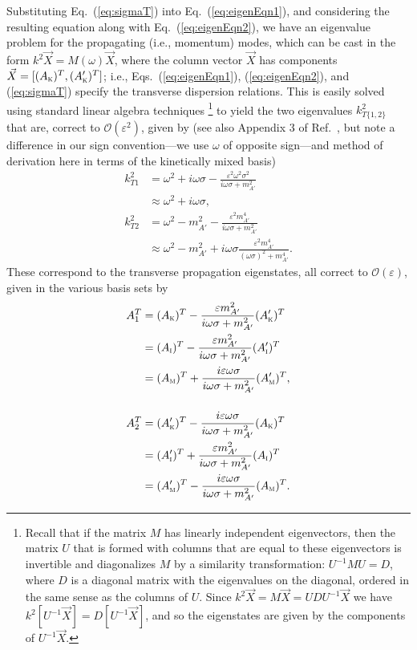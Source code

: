 \documentclass[amsmath,amssymb,aps,10pt,prd,letterpaper,nofootinbib,balancelastpage,notitlepage,superscriptaddress,twocolumn,floatfix]{revtex4-2}
\renewcommand{\eqref}[2][]{Eq{#1}.~(\ref{eq:#2})}	%
\newcommand{\citeR}[2][]{Ref{#1}.~\cite{#2}}		%
\newcommand{\kin}[1]{({#1}_{\textsc{k}})}
\newcommand{\primekin}[1]{({#1}_{\textsc{k}}^\prime)}
\newcommand{\mass}[1]{({#1}_{\textsc{m}})}
\newcommand{\primemass}[1]{({#1}_{\textsc{m}}^\prime)}
\newcommand{\inter}[1]{({#1}_{\textsc{i}})}
\newcommand{\primeinter}[1]{({#1}_{\textsc{i}}^\prime)}
\begin{document}
Substituting \eqref{sigmaT} into \eqref{eigenEqn1}, and considering the resulting equation along with \eqref{eigenEqn2}, we have an eigenvalue problem for the propagating (i.e., momentum) modes, which can be cast in the form $k^2 \vec X = M(\omega) \vec X$, where the column vector $\vec X$ has components $\vec X = [ \kin{A}^T , \primekin{A}^T ]$; i.e., \eqref[s]{eigenEqn1}, (\ref{eq:eigenEqn2}), and (\ref{eq:sigmaT}) specify the transverse dispersion relations.
This is easily solved using standard linear algebra techniques%
\footnote{\label{ftnt:diagonalization}%
    Recall that if the matrix $M$ has linearly independent eigenvectors, then the matrix $U$ that is formed with columns that are equal to these eigenvectors is invertible and diagonalizes $M$ by a similarity transformation: $U^{-1}MU = D$, where $D$ is a diagonal matrix with the eigenvalues on the diagonal, ordered in the same sense as the columns of $U$.
    Since $k^2 \vec{X} = M \vec{X} = U D U^{-1}\vec{X}$ we have $ k^2 [ U^{-1} \vec{X} ] = D [ U^{-1} \vec{X}]$, and so the eigenstates are given by the components of $U^{-1} \vec{X}$.
} %
to yield the two eigenvalues $k_{T\{1,2\}}^2$ that are, correct to $\mathcal{O}(\varepsilon^2)$, given by (see also Appendix 3 of \citeR{Graham:2014sha}, but note a difference in our sign convention---we use $\omega$ of opposite sign---and method of derivation here in terms of the kinetically mixed basis)
\begin{align}
    k_{T1}^2 &= \omega^2 + i\omega\sigma - \frac{\varepsilon^2 \omega^2 \sigma^2}{i\omega \sigma + m_{A'}^2 }\label{eq:kT1Sq}\\
    &\approx   \omega^2 + i\omega\sigma, \label{eq:dispersion1}\\[3ex]
    k_{T2}^2 &= \omega^2 - m_{A'}^2 - \frac{\varepsilon^2 m_{A'}^4}{i\omega \sigma + m_{A'}^2 }\label{eq:kT2Sq}\\
    &\approx \omega^2 - m_{A'}^2 + i\omega\sigma \frac{ \varepsilon^2 m_{A'}^4}{ (\omega \sigma)^2 + m_{A'}^4 }.\label{eq:dispersion2}   
\end{align}
These correspond to the transverse propagation eigenstates, all correct to $\mathcal{O}(\varepsilon)$, given in the various basis sets by~\cite{Graham:2014sha}
\begin{align}
    A^T_1 &= \kin{A}^T - \frac{\varepsilon m_{A'}^2}{i\omega \sigma + m_{A'}^2 } \primekin{A}^T \label{eq:mode1kin}\\
    &= \inter{A}^T - \frac{\varepsilon m_{A'}^2}{i\omega \sigma + m_{A'}^2 } \primeinter{A}^T \label{eq:mode1inter}\\
    &=  \mass{A}^T + \frac{i \varepsilon  \omega \sigma }{i\omega \sigma + m_{A'}^2 } \primemass{A}^T, \label{eq:mode1mass}\\[3ex]
    A^T_2 &= \primekin{A}^T - \frac{i \varepsilon \omega\sigma }{i\omega \sigma + m_{A'}^2 } \kin{A}^T \label{eq:mode2kin}\\
    &=\primeinter{A}^T + \frac{ \varepsilon m_{A'}^2 }{i\omega \sigma + m_{A'}^2 } \inter{A}^T \label{eq:mode2inter}\\
    &= \primemass{A}^T - \frac{i \varepsilon \omega\sigma }{i\omega \sigma + m_{A'}^2 } \mass{A}^T. \label{eq:mode2mass}
\end{align}
\end{document}
